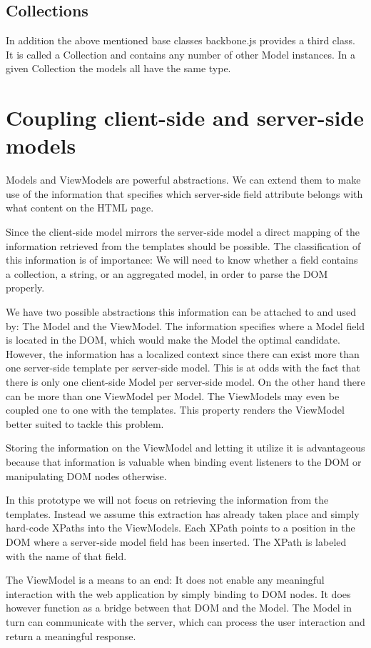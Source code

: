 \subsection{Collections}
In addition the above mentioned base classes backbone.js provides a third class.
It is called a Collection and contains any number of other Model instances.
In a given Collection the models all have the same type.

\section{Coupling client-side and server-side models}
Models and ViewModels are powerful abstractions.
We can extend them to make use of the information that specifies
which server-side field attribute belongs with what content on the HTML page.

Since the client-side model mirrors the server-side model a direct mapping of
the information retrieved from the templates should be possible.
The classification of this information is of importance: We will need to know
whether a field contains a collection, a string, or an aggregated model,
in order to parse the DOM properly.

We have two possible abstractions this information can be attached to and
used by: The Model and the ViewModel.
The information specifies where a Model field is located in the DOM, which would
make the Model the optimal candidate. However, the information has a
localized context since there can exist more than one server-side template per
server-side model.
This is at odds with the fact that there is only one client-side Model
per server-side model.
On the other hand there can be more than one ViewModel per Model.
The ViewModels may even be coupled one to one with the templates.
This property renders the ViewModel better suited to tackle this problem.

Storing the information on the ViewModel and letting it utilize it is
advantageous because that information is valuable when binding event listeners
to the DOM or manipulating DOM nodes otherwise.

In this prototype we will not focus on retrieving the information from
the templates. Instead we assume this extraction has already taken place and
simply hard-code XPaths into the ViewModels. Each XPath points to a
position in the DOM where a server-side model field has been inserted.
The XPath is labeled with the name of that field.

The ViewModel is a means to an end: It does not enable any meaningful
interaction with the web application by simply binding to DOM nodes.
It does however function as a bridge between that DOM and the Model.
The Model in turn can communicate with the server, which can process
the user interaction and return a meaningful response.

